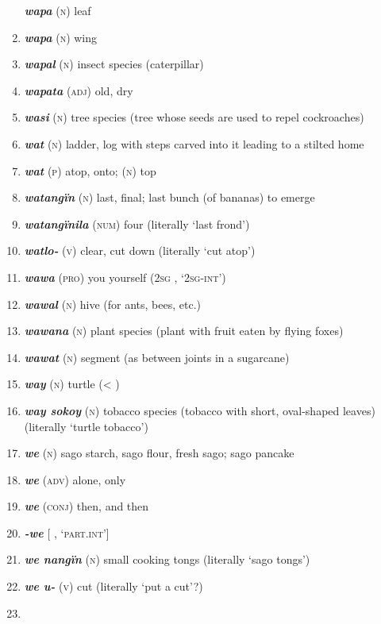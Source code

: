 \begin{enumerate}[noitemsep, label={}, align=left, widest=190, labelsep=1ex,leftmargin=*,itemindent=-10pt]
\textbf{\textit{wapa}} (\textsc{n}) leaf \item 
\textbf{\textit{wapa}} (\textsc{n}) wing \item 
\textbf{\textit{wapal}} (\textsc{n}) insect species (caterpillar) \item 
\textbf{\textit{wapata}} (\textsc{adj}) old, dry \item 
\textbf{\textit{wasi}} (\textsc{n}) tree species (tree whose seeds are used to repel cockroaches) \item 
\textbf{\textit{wat}} (\textsc{n}) ladder, log with steps carved into it leading to a stilted home \item 
\textbf{\textit{wat}} (\textsc{p}) atop, onto; (\textsc{n}) top \item 
\textbf{\textit{watangïn}} (\textsc{n}) last, final; last bunch (of bananas) to emerge \item 
\textbf{\textit{watangïnila}} (\textsc{num}) four (literally ‘last frond’) \item 
\textbf{\textit{watlo-}} (\textsc{v}) clear, cut down (literally ‘cut atop’) \item 
\textbf{\textit{wawa}} (\textsc{pro}) you yourself (2\textsc{sg} , ‘\textsc{2sg-int}’) \item 
\textbf{\textit{wawal}} (\textsc{n}) hive (for ants, bees, etc.) \item 
\textbf{\textit{wawana}} (\textsc{n}) plant species (plant with fruit eaten by flying foxes) \item 
\textbf{\textit{wawat}} (\textsc{n}) segment (as between joints in a sugarcane) \item 
\textbf{\textit{way}} (\textsc{n}) turtle (< ) \item 
\textbf{\textit{way sokoy}} (\textsc{n}) tobacco species (tobacco with short, oval-shaped leaves) (literally ‘turtle tobacco’) \item 
\textbf{\textit{we}} (\textsc{n}) sago starch, sago flour, fresh sago; sago pancake \item 
\textbf{\textit{we}} (\textsc{adv}) alone, only \item 
\textbf{\textit{we}} (\textsc{conj}) then, and then \item 
\textbf{\textit{-we}} [ , ‘\textsc{part.int}’] \item 
\textbf{\textit{we nangïn}} (\textsc{n}) small cooking tongs (literally ‘sago tongs’) \item 
\textbf{\textit{we u-}} (\textsc{v}) cut (literally ‘put a cut’?) \item 

\end{enumerate}
